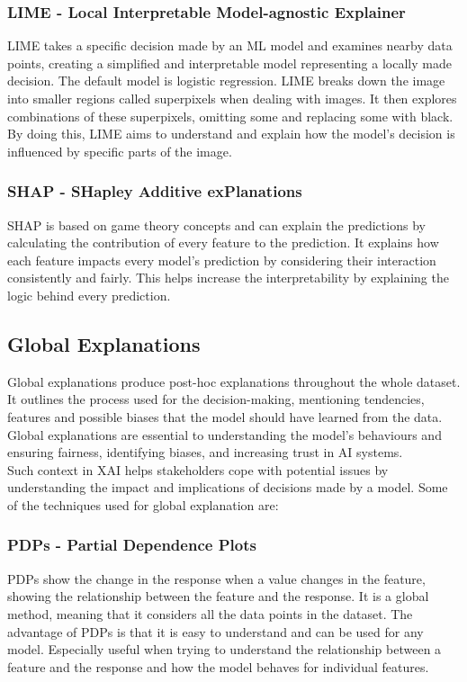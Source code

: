 \documentclass[10pt,journal,compsoc]{IEEEtran}
\begin{document}
\subsubsection{LIME - Local Interpretable Model-agnostic Explainer}
LIME takes a specific decision made by an ML model and examines nearby data points, creating a simplified and interpretable model representing a locally made decision\cite{phillips2020four}. The default model is logistic regression.
LIME breaks down the image into smaller regions called superpixels when dealing with images. It then explores combinations of these superpixels, omitting some and replacing some with black. By doing this, LIME aims to understand and explain how the model's decision is influenced by specific parts of the image.

\subsubsection{SHAP - SHapley Additive exPlanations} SHAP is based on game theory concepts and can explain the predictions by calculating the contribution of every feature to the prediction. It explains how each feature impacts every model's prediction by considering their interaction consistently and fairly. This helps increase the interpretability by explaining the logic behind every prediction.\cite{why-trust-you}

\subsection{Global Explanations}
Global explanations produce post-hoc explanations throughout the whole dataset. It outlines the process used for the decision-making, mentioning tendencies,\\
features and possible biases that the model should have learned from the data. Global explanations are essential to understanding the model's behaviours and ensuring fairness, identifying biases, and increasing trust in AI systems. \\
Such context in XAI helps stakeholders cope with potential issues by understanding the impact and implications of decisions made by a model. Some of the techniques used for global explanation are:

\subsubsection{PDPs - Partial Dependence Plots}
PDPs show the change in the response when a value changes in the feature, showing the relationship between the feature and the response. It is a global method, meaning that it considers all the data points in the dataset.
The advantage of PDPs is that it is easy to understand and can be used for any model. Especially useful when trying to understand the relationship between a feature and the response and how the model behaves for individual features.\cite{phillips2020four}
\end{document}
